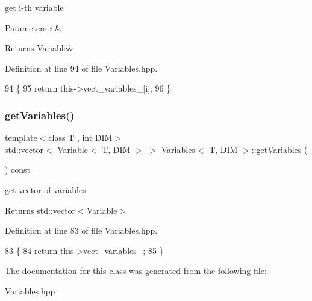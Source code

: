 get i-\/th variable 


\begin{DoxyParams}{Parameters}
{\em i} & \\
\hline
\end{DoxyParams}
\begin{DoxyReturn}{Returns}
\hyperlink{classVariable}{Variable}\& 
\end{DoxyReturn}


Definition at line 94 of file Variables.\+hpp.


\begin{DoxyCode}
94                                                               \{
95   \textcolor{keywordflow}{return} this->vect\_variables\_[i];
96 \}
\end{DoxyCode}
\mbox{\label{classVariables_a62a9cd30a9cfce3896ede05747e14871}} 
\subsubsection{\texorpdfstring{get\+Variables()}{getVariables()}}
{\footnotesize\ttfamily template$<$class T , int D\+IM$>$ \\
std\+::vector$<$ \hyperlink{classVariable}{Variable}$<$ T, D\+IM $>$ $>$ \hyperlink{classVariables}{Variables}$<$ T, D\+IM $>$\+::get\+Variables (\begin{DoxyParamCaption}{ }\end{DoxyParamCaption}) const}



get vector of variables 

\begin{DoxyReturn}{Returns}
std\+::vector$<$\+Variable$>$ 
\end{DoxyReturn}


Definition at line 83 of file Variables.\+hpp.


\begin{DoxyCode}
83                                                                   \{
84   \textcolor{keywordflow}{return} this->vect\_variables\_;
85 \}
\end{DoxyCode}


The documentation for this class was generated from the following file\+:\begin{DoxyCompactItemize}
\item 
Variables.\+hpp\end{DoxyCompactItemize}
